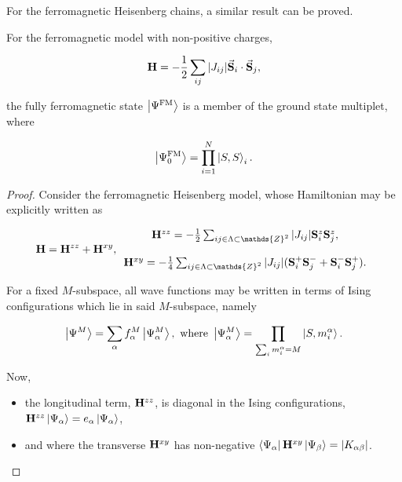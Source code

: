 \documentclass{homework}
\begin{document}
For the ferromagnetic Heisenberg chains, a similar result can be proved. 

\begin{corr}
For the ferromagnetic model with non-positive charges, 

$$
{\bf H} = - \frac{1}{2} \sum_{ij} |J_{ij}| \vec{{\bf S}}_i \cdot \vec{{\bf S}}_j,
$$

the fully ferromagnetic state $\ket{\Psi^{\textnormal{FM}}}$ is a member of the ground state multiplet, where 

$$
    \ket{\Psi_0^{\textnormal{FM}}} = \prod_{i=1}^N \ket{S, S}_i.
$$

\end{corr}

\begin{proof}

Consider the ferromagnetic Heisenberg model, whose Hamiltonian may be explicitly written as 

\begin{equation}
     {\bf H} = {\bf H}^{zz} + {\bf H}^{xy}, \begin{array}{c}
         {\bf H}^{zz} = -\frac{1}{2} \sum_{ij \in \Lambda \subset \mathds{Z}^{2}} |J_{ij}| \spin_i^z \spin_j^z, \\  
         \\
         {\bf H}^{xy} = -\frac{1}{4} \sum_{ij \in \Lambda \subset \mathds{Z}^{2}} |J_{ij}| (\spin_i^+ \spin_j^- + \spin_i^- \spin_j^+). \\  
    \end{array}
\end{equation}

For a fixed $M$-subspace, all wave functions may be written in terms of Ising configurations which lie in said $M$-subspace, namely

\begin{equation}
    \ket{\Psi^M} = \sum_{\alpha} f_{\alpha}^M \ket{{\Psi}^M_{\alpha}}, \textnormal{ where } \ket{{\Psi}^M_{\alpha}} = \prod_{\sum_{i} {m}_i^\alpha = M} \ket{S, {m}_i^\alpha}. 
\end{equation}

Now, 

\begin{itemize}
    \item the longitudinal term, ${{\bf H}}^{zz}$, is diagonal in the Ising configurations, ${{\bf H}}^{zz}\ket{{\Psi}_{\alpha}} = e_{\alpha} \ket{{\Psi}_{\alpha}}$,
    \item and where the transverse ${{\bf H}}^{xy}$ has non-negative $\bra{{\Psi}_{\alpha}} {{\bf H}}^{xy}  \ket{{\Psi}_{\beta}} = |K_{\alpha \beta}|$.
\end{itemize}


\end{proof}
\end{document}
